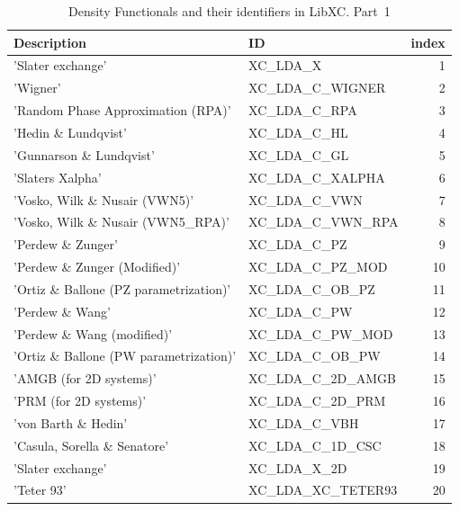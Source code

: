 \documentclass[final,12pt]{article}
\begin{document}
{{{{{{\begin{table}[hbt]
\caption{\label{tab:libxc1}Density Functionals and their identifiers
  in LibXC. Part~1}
\begin{center}
\begin{tabular}{llr}
\hline
\hline
Description & ID & index\\
\hline
  'Slater exchange' & XC\_LDA\_X  &  1\\
  'Wigner' & XC\_LDA\_C\_WIGNER  &  2\\
  'Random Phase Approximation (RPA)' & XC\_LDA\_C\_RPA  &  3\\
  'Hedin \& Lundqvist' & XC\_LDA\_C\_HL  &  4\\
  'Gunnarson \& Lundqvist' & XC\_LDA\_C\_GL  &  5\\
  'Slaters Xalpha' & XC\_LDA\_C\_XALPHA  &  6\\
  'Vosko, Wilk \& Nusair (VWN5)' & XC\_LDA\_C\_VWN  &  7\\
  'Vosko, Wilk \& Nusair (VWN5\_RPA)' & XC\_LDA\_C\_VWN\_RPA  &  8\\
  'Perdew \& Zunger' & XC\_LDA\_C\_PZ  &  9\\
  'Perdew \& Zunger (Modified)' & XC\_LDA\_C\_PZ\_MOD  & 10\\
  'Ortiz \& Ballone (PZ parametrization)' & XC\_LDA\_C\_OB\_PZ  & 11\\
  'Perdew \& Wang' & XC\_LDA\_C\_PW  & 12\\
  'Perdew \& Wang (modified)' & XC\_LDA\_C\_PW\_MOD  & 13\\
  'Ortiz \& Ballone (PW parametrization)' & XC\_LDA\_C\_OB\_PW  & 14\\
  'AMGB (for 2D systems)' & XC\_LDA\_C\_2D\_AMGB  & 15\\
  'PRM (for 2D systems)' & XC\_LDA\_C\_2D\_PRM  & 16\\
  'von Barth \& Hedin' & XC\_LDA\_C\_VBH  & 17\\
  'Casula, Sorella \& Senatore' & XC\_LDA\_C\_1D\_CSC  & 18\\
  'Slater exchange' & XC\_LDA\_X\_2D  & 19\\
  'Teter 93' & XC\_LDA\_XC\_TETER93  & 20\\
\hline
\hline
\end{tabular}
\end{center}
\end{table}


}}}}}}
\end{document}
